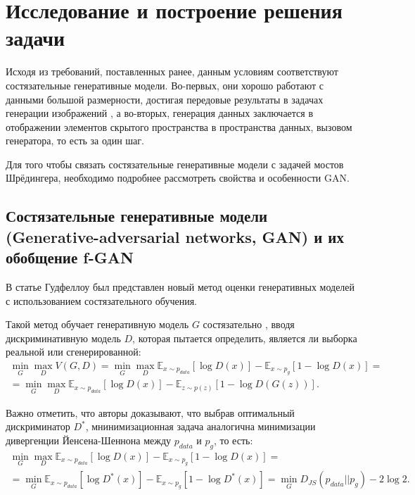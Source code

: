 \section{Исследование и построение решения задачи}
\label{sec:Chapter4} 

Исходя из требований, поставленных ранее, данным условиям соответствуют состязательные генеративные модели. Во-первых, они хорошо работают с данными большой размерности, достигая передовые результаты в задачах генерации изображений \cite{style-gan}, а во-вторых, генерация данных заключается в отображении элементов скрытого пространства в пространства данных, вызовом генератора, то есть за один шаг.

Для того чтобы связать состязательные генеративные модели с задачей мостов Шрёдингера, необходимо подробнее рассмотреть свойства и особенности GAN.

\subsection{Состязательные генеративные модели (Generative-adversarial networks, GAN) и их обобщение f-GAN}
В статье Гудфеллоу \cite{gan} был представлен новый метод оценки генеративных моделей с использованием состязательного обучения.

Такой метод обучает генеративную модель $G$ состязательно , вводя дискриминативную модель $D$, которая пытается определить, является ли выборка реальной или сгенерированной:
\begin{multline*}
    \min_{G}\max_{D}V(G, D) = \min_{G}\max_{D} \mathbb{E}_{x\sim p_{data}} [\log D(x)] - \mathbb{E}_{x\sim p_g} [1 - \log D(x)] = \\ = \min_{G}\max_{D} \mathbb{E}_{x\sim p_{data}} [\log D(x)] - \mathbb{E}_{z\sim p(z)} [1 - \log D(G(z))].
\end{multline*}

Важно отметить, что авторы доказывают, что выбрав оптимальный дискриминатор $D^*$, мнинимизационная задача аналогична минимизации дивергенции Йенсена-Шеннона между $p_{data}$ и $p_g$, то есть:
\begin{multline}
    \min_{G}\max_{D} \mathbb{E}_{x\sim p_{data}} [\log D(x)] - \mathbb{E}_{x\sim p_g} [1 - \log D(x)] = \\ 
    = \min_{G} \mathbb{E}_{x\sim p_{data}} [\log D^*(x)] - \mathbb{E}_{x\sim p_g} [1 - \log D^*(x)] = \min_{G}D_{JS}(p_{data}||p_g) - 2\log 2.
    \label{eq:gan}
\end{multline}

